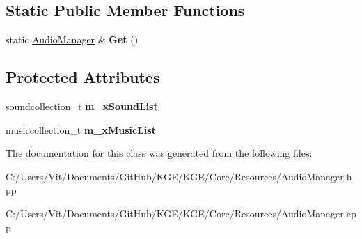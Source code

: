 \subsection*{Static Public Member Functions}
\begin{DoxyCompactItemize}
\item 
\hypertarget{class_k_g_e_1_1_audio_manager_a36f4d0f8cf9965e964dda470e50739f8}{static \hyperlink{class_k_g_e_1_1_audio_manager}{Audio\-Manager} \& {\bfseries Get} ()}\label{class_k_g_e_1_1_audio_manager_a36f4d0f8cf9965e964dda470e50739f8}

\end{DoxyCompactItemize}
\subsection*{Protected Attributes}
\begin{DoxyCompactItemize}
\item 
\hypertarget{class_k_g_e_1_1_audio_manager_ab527929d483d470f8dc40a63a4197c50}{soundcollection\-\_\-t {\bfseries m\-\_\-x\-Sound\-List}}\label{class_k_g_e_1_1_audio_manager_ab527929d483d470f8dc40a63a4197c50}

\item 
\hypertarget{class_k_g_e_1_1_audio_manager_accb62181d1b08212b64cec52c5aaba1d}{musiccollection\-\_\-t {\bfseries m\-\_\-x\-Music\-List}}\label{class_k_g_e_1_1_audio_manager_accb62181d1b08212b64cec52c5aaba1d}

\end{DoxyCompactItemize}


The documentation for this class was generated from the following files\-:\begin{DoxyCompactItemize}
\item 
C\-:/\-Users/\-Vit/\-Documents/\-Git\-Hub/\-K\-G\-E/\-K\-G\-E/\-Core/\-Resources/Audio\-Manager.\-hpp\item 
C\-:/\-Users/\-Vit/\-Documents/\-Git\-Hub/\-K\-G\-E/\-K\-G\-E/\-Core/\-Resources/Audio\-Manager.\-cpp\end{DoxyCompactItemize}
